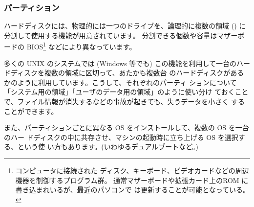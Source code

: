 \documentclass[platex]{jsarticle}
\begin{document}
 \subsubsection{パーティション}
 ハードディスクには、物理的には一つのドライブを、論理的に複数の領域
 () に分割して使用する機能が用意されています。
 分割できる個数や容量はマザーボードの BIOS\footnote{ コンピュータに接続された
   ディスク、キーボード、ビデオカードなどの周辺機器を制御するプログラム群。
   通常マザーボードや拡張カード上のROM に書き込まれいるが、最近のパソコンで
   は更新することが可能となっている。} などにより異なっています。

 多くの UNIX のシステムでは (Windows 等でも)
 この機能を利用して一台のハードディスクを複数の領域に区切って、あたかも複数台
 のハードディスクがあるかのように利用しています。こうして、それぞれのパーティ
 ションについて「システム用の領域」「ユーザのデータ用の領域」のように使い分け
 ておくことで、ファイル情報が消失するなどの事故が起きても、失うデータを小さく
 することができます。

 また、パーティションごとに異なる OS をインストールして、複数の OS を一台のハー
 ドディスクの中に共存させ、マシンの起動時に立ち上げる OS を選択する、という使
 い方もあります。(いわゆるデュアルブートなど。)
 
\end{document}

